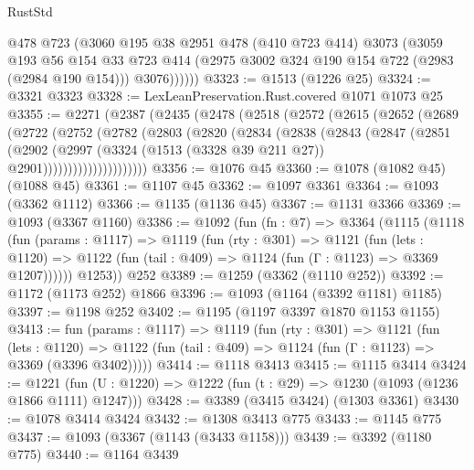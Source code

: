 \begin{lexlean}{RustStd}
\begin{coremodule}
            @478
            @723
            (@3060
              @195
              @38
              @2951
              @478
              (@410 @723 @414)
              @3073
              (@3059
                @193
                @56
                @154
                @33
                @723
                @414
                (@2975 @3002 @324 @190 @154 @722 (@2983 (@2984 @190 @154)))
                @3076))))))
@3323 := @1513 (@1226 @25)
@3324 := @3321 @3323
@3328 := LexLeanPreservation.Rust.covered @1071 @1073 @25
@3355 := @2271
    (@2387
      (@2435
        (@2478
          (@2518
            (@2572
              (@2615
                (@2652
                  (@2689
                    (@2722
                      (@2752
                        (@2782
                          (@2803
                            (@2820
                              (@2834
                                (@2838
                                  (@2843
                                    (@2847
                                      (@2851
                                        (@2902
                                          (@2997
                                            (@3324
                                              (@1513 (@3328 @39 @211 @27))
                                              @2901)))))))))))))))))))))
@3356 := @1076 @45
@3360 := @1078 (@1082 @45) (@1088 @45)
@3361 := @1107 @45
@3362 := @1097 @3361
@3364 := @1093 (@3362 @1112)
@3366 := @1135 (@1136 @45)
@3367 := @1131 @3366
@3369 := @1093 (@3367 @1160)
@3386 := @1092
    (fun (fn : @7) =>
    @3364
      (@1115
        (@1118
          (fun (params : @1117) =>
          @1119
            (fun (rty : @301) =>
            @1121
              (fun (lets : @1120) =>
              @1122 (fun (tail : @409) => @1124 (fun (Γ : @1123) => @3369 @1207))))))
        @1253))
    @252
@3389 := @1259 (@3362 (@1110 @252))
@3392 := @1172 (@1173 @252) @1866
@3396 := @1093 (@1164 (@3392 @1181) @1185)
@3397 := @1198 @252
@3402 := @1195 (@1197 @3397 @1870 @1153 @1155)
@3413 := fun (params : @1117) =>
  @1119
    (fun (rty : @301) =>
    @1121
      (fun (lets : @1120) =>
      @1122 (fun (tail : @409) => @1124 (fun (Γ : @1123) => @3369 (@3396 @3402)))))
@3414 := @1118 @3413
@3415 := @1115 @3414
@3424 := @1221 (fun (U : @1220) => @1222 (fun (t : @29) => @1230 (@1093 (@1236 @1866 @1111) @1247)))
@3428 := @3389 (@3415 @3424) (@1303 @3361)
@3430 := @1078 @3414 @3424
@3432 := @1308 @3413 @775
@3433 := @1145 @775
@3437 := @1093 (@3367 (@1143 (@3433 @1158)))
@3439 := @3392 (@1180 @775)
@3440 := @1164 @3439

\end{coremodule}
\end{lexlean}
